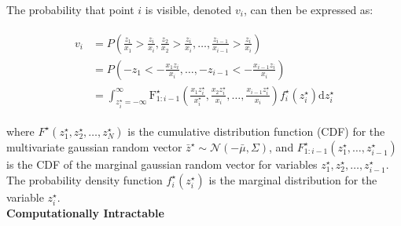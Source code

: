 The probability that point $i$ is visible, denoted $v_i$, can then be expressed as:

\begin{align}
\begin{split}
v_i &= P(\frac{z_1}{x_1} > \frac{z_i}{x_i}, \frac{z_2}{x_2} > \frac{z_i}{x_i}, \hdots, \frac{z_{i-1}}{x_{i-1}} > \frac{z_i}{x_i}) \\
&= P(-z_1 < -\frac{x_1z_i}{x_i}, \hdots, -z_{i-1} < -\frac{x_{i-1}z_i}{x_i}) \\
&= \int_{z_i^{\star} = -\infty}^\infty \mathrm{F}_{1:i-1}^{\star}(\frac{x_1z_i^{\star}}{x_i^{\star}}, \frac{x_2z_i^{\star}}{x_i}, \hdots, \frac{x_{i-1}z_i^{\star}}{x_i})f_i^{\star}(z_i^{\star})\mathrm{d}z_i^{\star}
\label{eq:mvn}
\end{split}
\end{align}

\noindent where $F^{\star}(z_1^{\star}, z_2^{\star}, \hdots, z_N^{\star})$ is the cumulative distribution function (CDF) for the multivariate gaussian random vector $\bar{z}^{\star} \sim \mathcal{N}(-\bar{\mu}, \Sigma)$, and $F_{1:i-1}^{\star}(z_1^{\star}, \hdots, z_{i-1}^{\star})$ is the CDF of the marginal gaussian random vector for variables $z_1^{\star}, z_2^{\star}, \hdots, z_{i-1}^{\star}$.  The probability density function $f_i^{\star}(z_i^{\star})$ is the marginal distribution for the variable $z_i^{\star}$. 
\\

\noindent \textbf{Computationally Intractable}
\\

